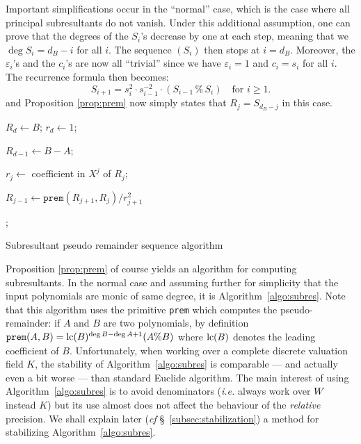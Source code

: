 \documentclass{article}
\begin{document}
Important simplifications occur in the ``normal'' case, which is the 
case where all principal subresultants do not vanish. Under this 
additional assumption, one can prove that the degrees of the $S_i$'s 
decrease by one at each step, meaning that we $\deg S_i = d_B - i$ for 
all $i$. The sequence $(S_i)$ then stops at $i = d_B$. Moreover, the 
$\varepsilon_i$'s and the $c_i$'s are now all ``trivial'' since we have 
$\varepsilon_i = 1$ and $c_i = s_i$ for all $i$. The recurrence formula 
then becomes:
$$S_{i+1} = s_i^2 \cdot s_{i-1}^{-2}
\cdot (S_{i-1} \,\%\, S_i) \quad \text{for } i \geq 1.$$
and Proposition \ref{prop:prem} now simply states that $R_j = S_{d_B-j}$ 
in this case.

\begin{algorithm}

  \BlankLine

  $R_d \leftarrow B$; $r_d \leftarrow 1$;

  $R_{d-1} \leftarrow B-A$;

    {$r_j \leftarrow$ coefficient in $X^j$ of $R_j$;


     $R_{j-1} \leftarrow \texttt{prem}(R_{j+1}, R_j) / r_{j+1}^2$
    }

  ;
\caption{Subresultant pseudo remainder sequence algorithm}
\label{algo:subres}
\end{algorithm}

Proposition \ref{prop:prem} of course yields an algorithm for computing 
subresultants. In the normal case and assuming further for simplicity 
that the input polynomials are monic of same degree, it is 
Algorithm~\ref{algo:subres}. Note that this algorithm uses the primitive 
\texttt{prem} which computes the pseudo-remainder: if $A$ and $B$ are 
two polynomials, by definition $\texttt{prem}(A,B) = \text{\rm lc}(B)^{\deg B-\deg 
A+1} (A \% B)$ where $\text{\rm lc}(B)$ denotes the leading coefficient of $B$. 
Unfortunately, when working over a complete discrete valuation field 
$K$, the stability of Algorithm~\ref{algo:subres} is comparable --- and 
actually even a bit worse --- than standard Euclide algorithm. The main 
interest of using Algorithm~\ref{algo:subres} is to avoid denominators 
(\emph{i.e.} always work over $W$ instead $K$) but its use almost does 
not affect the behaviour of the \emph{relative} precision. We shall 
explain later (\emph{cf} \S~\ref{subsec:stabilization}) a method for 
stabilizing Algorithm~\ref{algo:subres}.
\end{document}
